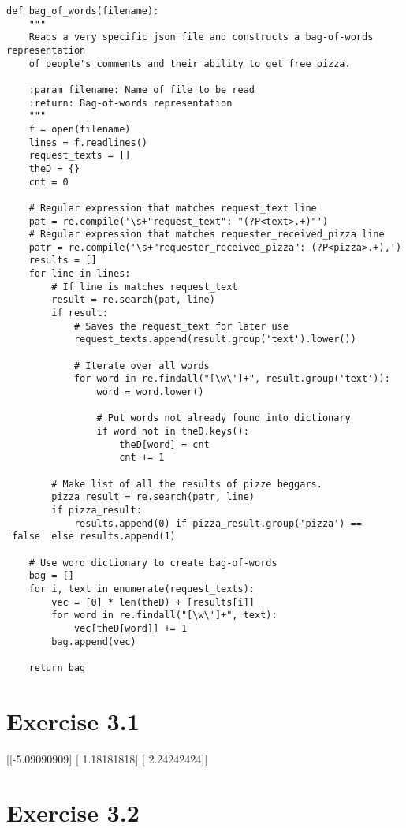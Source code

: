 \documentclass{article}
\begin{document}
\begin{lstlisting}
def bag_of_words(filename):
    """
    Reads a very specific json file and constructs a bag-of-words representation
    of people's comments and their ability to get free pizza.

    :param filename: Name of file to be read
    :return: Bag-of-words representation
    """
    f = open(filename)
    lines = f.readlines()
    request_texts = []
    theD = {}
    cnt = 0

    # Regular expression that matches request_text line
    pat = re.compile('\s+"request_text": "(?P<text>.+)"')
    # Regular expression that matches requester_received_pizza line
    patr = re.compile('\s+"requester_received_pizza": (?P<pizza>.+),')
    results = []
    for line in lines:
        # If line is matches request_text
        result = re.search(pat, line)
        if result:
            # Saves the request_text for later use
            request_texts.append(result.group('text').lower())

            # Iterate over all words
            for word in re.findall("[\w\']+", result.group('text')):
                word = word.lower()

                # Put words not already found into dictionary
                if word not in theD.keys():
                    theD[word] = cnt
                    cnt += 1

        # Make list of all the results of pizze beggars.
        pizza_result = re.search(patr, line)
        if pizza_result:
            results.append(0) if pizza_result.group('pizza') == 'false' else results.append(1)

    # Use word dictionary to create bag-of-words
    bag = []
    for i, text in enumerate(request_texts):
        vec = [0] * len(theD) + [results[i]]
        for word in re.findall("[\w\']+", text):
            vec[theD[word]] += 1
        bag.append(vec)

    return bag
\end{lstlisting}


\section{Exercise 3.1}

[[-5.09090909]
 [ 1.18181818]
 [ 2.24242424]]

\section{Exercise 3.2}
 
\end{document}
